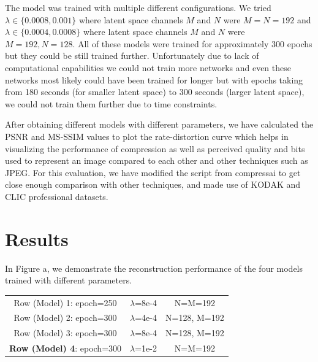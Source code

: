 \documentclass{article}
\begin{document}
The model was trained with multiple different configurations. We tried $\lambda \in \{0.0008, 0.001\}$ where latent space channels $M$ and $N$ were $M=N=192$ and $\lambda \in \{0.0004, 0.0008\}$ where latent space channels $M$ and $N$ were $M=192, N=128$.
All of these models were trained for approximately 300 epochs but they could be still trained further.
Unfortunately due to lack of computational capabilities we could not train more networks and even these networks most likely could have been trained for longer but with epochs taking from 180 seconds (for smaller latent space) to 300 seconds (larger latent space), we could not train them further due to time constraints.

After obtaining different models with different parameters, we have calculated the PSNR and MS-SSIM \cite{Bjntegaard2001CalculationOA, WangZhou2003Mssf} values to plot the rate-distortion curve which helps in visualizing the performance of compression as well as perceived quality and bits used to represent an image compared to each other and other techniques such as JPEG. For this evaluation, we have modified the script from compressai \cite{compressai} to get close enough comparison with other techniques, and made use of KODAK\cite{kodak} and CLIC professional \cite{clic} datasets.


\section{Results}
\label{sec:results}

In Figure a, we demonstrate the reconstruction performance of the four models trained with different parameters.

\begin{table}[!h]
\label{table:models}
\begin{center}
\begin{tabular}{c c c}
    Row (Model) 1: epoch=250 & $\lambda$=8e-4 & N=M=192 \\
    Row (Model) 2: epoch=300 & $\lambda$=4e-4 & N=128, M=192 \\
    Row (Model) 3: epoch=300 & $\lambda$=8e-4 & N=128, M=192 \\
    \textbf{Row (Model) 4}: epoch=300 & $\lambda$=1e-2 & N=M=192 \\
\end{tabular}
\end{center}
\end{table}

\pagebreak
\end{document}
